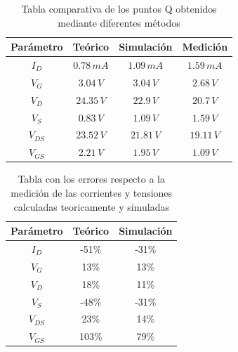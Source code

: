 \documentclass[10pt,spanish,a4paper,notitlepage]{article}
\begin{document}
    \begin{table}[H]
    \centering
    \begin{tabular}{|c|c|c|c|} %
    \hline
    Parámetro & Teórico &  Simulación & Medición \\ \hline
    $I_D$ & $0.78\,\unit{mA}$  &  $1.09\,\unit{mA}$ & $1.59\,\unit{mA}$   \\ \hline
    $V_{G}$ & $3.04\,\unit{V}$ & $3.04\,\unit{V}$  &  $2.68\,\unit{V}$  \\ \hline
    $V_{D}$ & $24.35\,\unit{V}$ & $22.9\,\unit{V}$  &  $20.7\,\unit{V}$  \\ \hline
    $V_{S}$ & $0.83\,\unit{V}$ & $1.09\,\unit{V}$  &  $1.59\,\unit{V}$  \\ \hline
    $V_{DS}$ & $23.52\,\unit{V}$ & $21.81\,\unit{V}$  &  $19.11\,\unit{V}$  \\ \hline
    $V_{GS}$ & $2.21\,\unit{V}$ & $1.95\,\unit{V}$ & $1.09\,\unit{V}$  \\ \hline
    \end{tabular}
    \caption{Tabla comparativa de los puntos Q obtenidos mediante diferentes métodos }
    \label{table:puntoq_comp}
    \end{table}

    \begin{table}[H]
    \centering
    \begin{tabular}{|c|c|c|} %
    \hline
    Parámetro & Teórico &  Simulación  \\ \hline
    $I_D$ & -51\%  & -31\%  \\ \hline
    $V_{G}$ & 13\% & 13\% \\ \hline
    $V_{D}$ & 18\% & 11\%  \\ \hline
    $V_{S}$ & -48\% & -31\%  \\ \hline
    $V_{DS}$ & 23\% & 14\%  \\ \hline
    $V_{GS}$ & 103\% & 79\%  \\ \hline
    \end{tabular}
    \caption{Tabla con los errores respecto a la medición de las corrientes y tensiones calculadas teoricamente y simuladas }
    \label{table:puntoq_comperror}
    \end{table}
\end{document}
